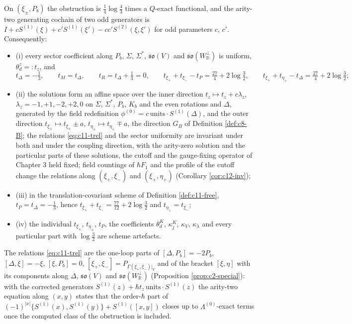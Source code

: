\begin{theorem}
On $(\xi_\pm,P_b)$ the obstruction is $\tfrac14\log\tfrac43$ times a $Q$-exact functional, and the arity-two generating cochain of two odd generators is $I+cS^{(1)}(\xi)+c'S^{(1)}(\xi')-cc'S^{(2)}(\xi,\xi')$ for odd parameters $c$, $c'$. Consequently:
\begin{itemize}
\item (i) every sector coefficient along $P_b$, $\Sigma$, $\Sigma^*$, $\mathfrak{so}(V)$ and $\mathfrak{so}(W_{\mathbb R}^\perp)$ is uniform, $\theta^z_d=:t_z$, and
\begin{equation}
t_\Delta=-\tfrac13,\qquad t_M=t_\Delta,\qquad t_R=t_\Delta+\tfrac13=0,\qquad t_{\xi_+}+t_{\xi_-}-t_P=\tfrac{27}4+2\log\tfrac32,\qquad t_{\xi_+}+t_{\eta_+}-t_\Delta=\tfrac{27}4+2\log\tfrac32;
\label{eq:c11-trel}
\end{equation}
\item (ii) the solutions form an affine space over the inner direction $t_z\mapsto t_z+c\lambda_z$, $\lambda_z=-1,+1,-2,+2,0$ on $\Sigma$, $\Sigma^*$, $P_b$, $K_b$ and the even rotations and $\Delta$, generated by the field redefinition $\phi^{(0)}=c\,\text{units}\cdot S^{(1)}(\Delta)$, and the outer direction $t_{\xi_\pm}\mapsto t_{\xi_\pm}\pm a$, $t_{\eta_\pm}\mapsto t_{\eta_\pm}\mp a$, the direction $G_B$ of Definition \ref{def:c8-B}; the relations \eqref{eq:c11-trel} and the sector uniformity are invariant under both and under the coupling direction, with the arity-zero solution and the particular parts of these solutions, the cutoff and the gauge-fixing operator of Chapter 3 held fixed; field countings of $\hbar F_1$ and the profile of the cutoff change the relations along $(\xi_+,\xi_-)$ and $(\xi_+,\eta_+)$ (Corollary \ref{cor:c12-inv});
\item (iii) in the translation-covariant scheme of Definition \ref{def:c11-free}, $t_P=t_\Delta=-\tfrac13$, hence $t_{\xi_+}+t_{\xi_-}=\tfrac{77}{12}+2\log\tfrac32$ and $t_{\eta_+}=t_{\xi_-}$;
\item (iv) the individual $t_{\xi_\pm}$, $t_{\eta_\pm}$, $t_P$, the coefficients $\theta^K_d$, $\kappa^K_j$, $\kappa_V$, $\kappa_\lambda$ and every particular part with $\log\tfrac32$ are scheme artefacts.
\end{itemize}
The relations \eqref{eq:c11-trel} are the one-loop parts of $[\Delta,P_b]=-2P_b$, $[\Delta,\xi]=-\xi$, $[\xi,P_b]=0$, $[\xi_+,\xi_-]=P_{\Gamma(\xi_+,\xi_-)|_V}$ and of the bracket $[\xi,\eta]$ with its components along $\Delta$, $\mathfrak{so}(V)$ and $\mathfrak{so}(W_{\mathbb R}^\perp)$ (Proposition \ref{prop:c2-special}): with the corrected generators $S^{(1)}(z)+\hbar t_z\,\text{units}\cdot S^{(1)}(z)$ the arity-two equation along $(x,y)$ states that the order-$\hbar$ part of $(-1)^{|x|}\{S^{(1)}(x),S^{(1)}(y)\}+S^{(1)}([x,y])$ closes up to $\Lambda^{(0)}$-exact terms once the computed class of the obstruction is included.
\end{theorem}

